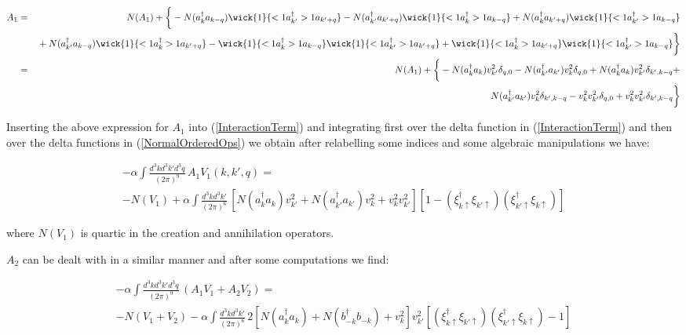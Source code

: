\begin{doublespace}
\begin{eqnarray}\label{NormalOrderedOps}
    A_{1} &=& N(A_{1})+ \bigg\{ - N(a^\dag_k a_{k-q})\wick{1}{<1a^\dag_{k'}>1a_{k'+q}}
    - N(a^\dag_{k'} a_{k'+q})\wick{1}{<1a^\dag_{k}>1a_{k-q}}
    + N(a_k^\dag a_{k'+q}) \wick{1}{<1a^\dag_{k'}>1a_{k-q}} \nonumber \\
    &&{} +N(a_{k'}^\dag a_{k-q})\wick{1}{<1a^\dag_{k}>1a_{k'+q}}
    - \wick{1}{<1a^\dag_{k}>1a_{k-q}} \wick{1}{<1a^\dag_{k'}>1a_{k'+q}}
    + \wick{1}{<1a^\dag_{k}>1a_{k'+q}} \wick{1}{<1a^\dag_{k'}>1a_{k-q}} \bigg\}\nonumber \\
    &=&N(A_{1}) +\bigg\{- N(a^\dag_k a_k) v^2_{k'} \delta_{q,0} - N(a^\dag_{k'} a_{k'}) v^2_k \delta_{q,0}
            + N(a^\dag_k a_k) v^2_{k'}\delta_{k',k-q} + \nonumber \\
         &&   N(a^\dag_{k'} a_{k'}) v^2_k\delta_{k',k-q} - v^2_k v^2_{k'} \delta_{q,0} + v^2_k v^2_{k'} \delta_{k',k-q}
            \bigg\}
\end{eqnarray}

Inserting the above expression for $A_1$ into (\ref{InteractionTerm}) and integrating first over
the delta function in (\ref{InteractionTerm}) and then over the delta functions in
(\ref{NormalOrderedOps}) we obtain after relabelling some indices and some algebraic manipulations
we have:

\begin{multline}\label{Int1}
  - \alpha  \int \frac{d^3k d^3k' d^3q}{(2\pi)^9}\, A_1 V_1(k,k',q)
            = \\-N(V_1) + \alpha  \int \frac{d^3k d^3k'}{(2\pi)^6}\,
    \left[ N(a^\dag_k a_k)v^2_{k'} + N(a^\dag_{k'}a_{k'})v^2_k + v^2_k v_{k'}^2 \right]
    \left[ 1 -
    \left(\xi^\dag_{k\uparrow}\xi_{k'\uparrow}\right)\left(\xi^\dag_{k'\uparrow}\xi_{k\uparrow}\right)
    \right]
\end{multline}

where $N(V_1)$ is quartic in the creation and annihilation operators.

$A_2$ can be dealt with in a similar manner and after some computations we find:

\begin{multline}\label{Int2}
    - \alpha  \int \frac{d^3k d^3k' d^3q}{(2\pi)^9}\, (A_1 V_1 + A_2 V_2) = \\
    -N(V_1 + V_2) - \alpha  \int \frac{d^3k d^3k'}{(2\pi)^6}\, 2
    \left[N(a^\dag_k a_k) + N(b^\dag_{-k}b_{-k}) + v^2_k \right] v^2_{k'}
    \left[
    \left(\xi^\dag_{k\uparrow}\xi_{k'\uparrow}\right)\left(\xi^\dag_{k'\uparrow}\xi_{k\uparrow}\right)
    -1
    \right]
\end{multline}


\end{doublespace}
